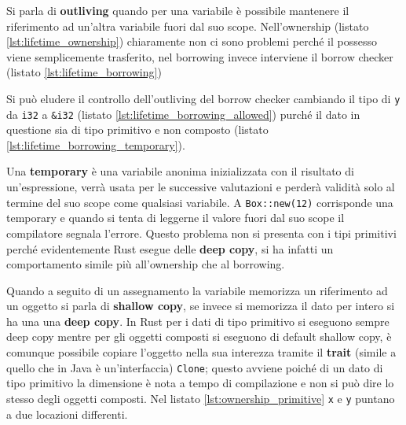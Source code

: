 \documentclass[Lau,binding=0.6cm]{sapthesis}
\newcommand{\textcode}[1]{\colorbox{backcolour}{\texttt{#1}}}
\begin{document}



Si parla di \textbf{outliving} quando per una variabile è possibile mantenere il riferimento ad un'altra variabile fuori dal suo scope. Nell'ownership (listato \ref{lst:lifetime_ownership}) chiaramente non ci sono problemi perché il possesso viene semplicemente trasferito, nel borrowing invece interviene il borrow checker (listato \ref{lst:lifetime_borrowing})







Si può eludere il controllo dell'outliving del borrow checker cambiando il tipo di \textcode{y} da \textcode{i32} a \textcode{\&i32} (listato \ref{lst:lifetime_borrowing_allowed}) purché il dato in questione sia di tipo primitivo e non composto (listato \ref{lst:lifetime_borrowing_temporary}). 

Una \textbf{temporary} è una variabile anonima inizializzata con il risultato di un'espressione, verrà usata per le successive valutazioni e perderà validità solo al termine del suo scope come qualsiasi variabile. A \textcode{Box::new(12)} corrisponde una temporary e quando si tenta di leggerne il valore fuori dal suo scope il compilatore segnala l'errore. Questo problema non si presenta con i tipi primitivi perché evidentemente Rust esegue delle \textbf{deep copy}, si ha infatti un comportamento simile più all'ownership che al borrowing. 







Quando a seguito di un assegnamento la variabile memorizza un riferimento ad un oggetto si parla di \textbf{shallow copy}, se invece si memorizza il dato per intero si ha una una \textbf{deep copy}. 
In Rust per i dati di tipo primitivo si eseguono sempre deep copy mentre per gli oggetti composti si eseguono di default shallow copy, è comunque possibile copiare l'oggetto nella sua interezza tramite il \textbf{trait} (simile a quello che in Java è un'interfaccia) \textcode{Clone}; questo avviene poiché di un dato di tipo primitivo la dimensione è nota a tempo di compilazione e non si può dire lo stesso degli oggetti composti. Nel listato \ref{lst:ownership_primitive} \textcode{x} e \textcode{y} puntano a due locazioni differenti.
\end{document}
